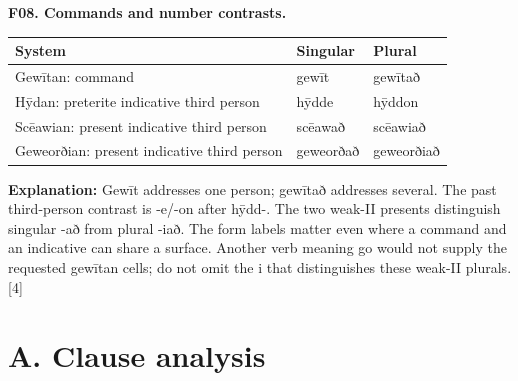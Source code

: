 \par\begin{minipage}{\linewidth}\raggedright
\textbf{F08. Commands and number contrasts.}

\par\begingroup
\fontsize{10.5}{13.2}\selectfont
\setlength{\LTleft}{0pt}\setlength{\LTright}{\fill}
\noindent
\begin{tabular}{@{}>{\raggedright\arraybackslash}p{66.23mm}>{\raggedright\arraybackslash}p{26.07mm}>{\raggedright\arraybackslash}p{26.07mm}@{}}
\toprule
\textbf{System} & \textbf{Singular} & \textbf{Plural} \\
\midrule
Gewītan: command & gewīt & gewītað \\
Hȳdan: preterite indicative third person & hȳdde & hȳddon \\
Scēawian: present indicative third person & scēawað & scēawiað \\
Geweorðian: present indicative third person & geweorðað & geweorðiað \\
\bottomrule
\end{tabular}
\par\endgroup

\textbf{Explanation:} Gewīt addresses one person; gewītað addresses several. The past third-person contrast is -e/\allowbreak{}-on after hȳdd-. The two weak-II presents distinguish singular -að from plural -iað. The form labels matter even where a command and an indicative can share a surface. Another verb meaning go would not supply the requested gewītan cells; do not omit the i that distinguishes these weak-II plurals. [4]

\end{minipage}\par\addvspace{4pt}

\section*{A. Clause analysis}

